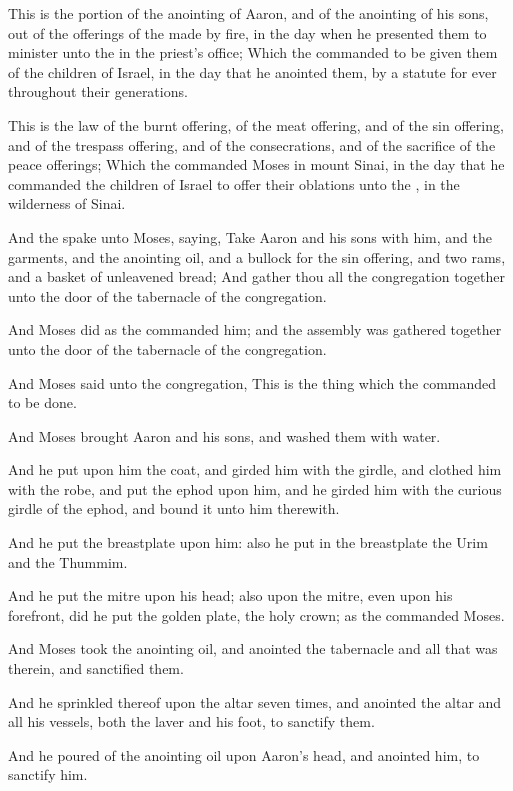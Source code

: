 \Verse This is the portion of the anointing of Aaron, and of the anointing of his sons, out of the offerings of the \LORD made by fire, in the day when he presented them to minister unto the \LORD in the priest's office; \Verse Which the \LORD commanded to be given them of the children of Israel, in the day that he anointed them, by a statute for ever throughout their generations.

\Verse This is the law of the burnt offering, of the meat offering, and of the sin offering, and of the trespass offering, and of the consecrations, and of the sacrifice of the peace offerings; \Verse Which the \LORD commanded Moses in mount Sinai, in the day that he commanded the children of Israel to offer their oblations unto the \LORD, in the wilderness of Sinai.

\Chapter
\Verse And the \LORD spake unto Moses, saying, \Verse Take Aaron and his sons with him, and the garments, and the anointing oil, and a bullock for the sin offering, and two rams, and a basket of unleavened bread; \Verse And gather thou all the congregation together unto the door of the tabernacle of the congregation.

\Verse And Moses did as the \LORD commanded him; and the assembly was gathered together unto the door of the tabernacle of the congregation.

\Verse And Moses said unto the congregation, This is the thing which the \LORD commanded to be done.

\Verse And Moses brought Aaron and his sons, and washed them with water.

\Verse And he put upon him the coat, and girded him with the girdle, and clothed him with the robe, and put the ephod upon him, and he girded him with the curious girdle of the ephod, and bound it unto him therewith.

\Verse And he put the breastplate upon him: also he put in the breastplate the Urim and the Thummim.

\Verse And he put the mitre upon his head; also upon the mitre, even upon his forefront, did he put the golden plate, the holy crown; as the \LORD commanded Moses.

\Verse And Moses took the anointing oil, and anointed the tabernacle and all that was therein, and sanctified them.

\Verse And he sprinkled thereof upon the altar seven times, and anointed the altar and all his vessels, both the laver and his foot, to sanctify them.

\Verse And he poured of the anointing oil upon Aaron's head, and anointed him, to sanctify him.

